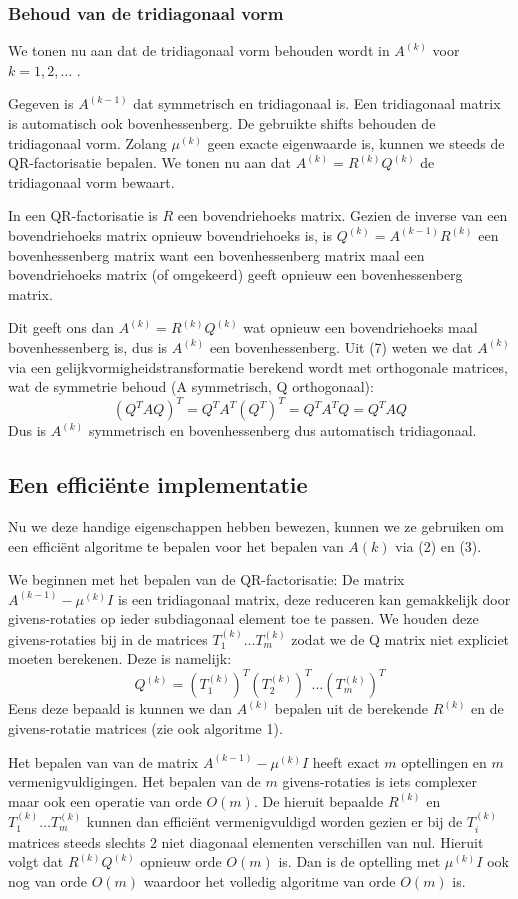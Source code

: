 \documentclass[a4paper]{article}
\begin{document}
\subsubsection{Behoud van de tridiagonaal vorm}
	We tonen nu aan dat de tridiagonaal vorm behouden wordt in $A^{(k)}$ voor $k = 1,2,\dots$ .
	
	\noindent Gegeven is $A^{(k-1)}$ dat symmetrisch en tridiagonaal is. Een tridiagonaal matrix is automatisch ook bovenhessenberg.
	De gebruikte shifts behouden de tridiagonaal vorm. Zolang $\mu ^{(k)}$ geen exacte eigenwaarde is, kunnen we steeds de QR-factorisatie bepalen. We tonen nu aan dat $A^{(k)} = R^{(k)}Q^{(k)}$ de tridiagonaal vorm bewaart.
	
	\noindent In een QR-factorisatie is $R$ een bovendriehoeks matrix. Gezien de inverse van een bovendriehoeks matrix opnieuw bovendriehoeks is, is $Q^{(k)} = A^{(k-1)}R^{(k)}$ een bovenhessenberg matrix want een bovenhessenberg matrix maal een bovendriehoeks matrix (of omgekeerd) geeft opnieuw een bovenhessenberg matrix.
	
	\noindent Dit geeft ons dan $A^{(k)} = R^{(k)}Q^{(k)}$ wat opnieuw een bovendriehoeks maal bovenhessenberg is, dus is $A^{(k)}$ een bovenhessenberg. Uit (7) weten we dat $A^{(k)}$ via een gelijkvormigheidstransformatie berekend wordt met orthogonale matrices, wat de symmetrie behoud (A symmetrisch, Q orthogonaal):
	\[
		(Q^TAQ)^T = Q^TA^T(Q^T)^T = Q^TA^TQ = Q^TAQ
	\]
	Dus is $A^{(k)}$ symmetrisch en bovenhessenberg dus automatisch tridiagonaal.
\subsection{Een efficiënte implementatie}
Nu we deze handige eigenschappen hebben bewezen, kunnen we ze gebruiken om een efficiënt algoritme te bepalen voor het bepalen van $A(k)$ via (2) en (3).

\noindent We beginnen met het bepalen van de QR-factorisatie: De matrix $A^{(k-1)} - \mu ^{(k)}I$ is een tridiagonaal matrix, deze reduceren kan gemakkelijk door givens-rotaties op ieder subdiagonaal element toe te passen. We houden deze givens-rotaties bij in de matrices $T^{(k)}_1\dots T^{(k)}_m$ zodat we de Q matrix niet expliciet moeten berekenen. Deze is namelijk:
\[
	Q^{(k)} = (T^{(k)}_1)^T(T^{(k)}_2)^T \dots (T^{(k)}_m)^T 
\]
Eens deze bepaald is kunnen we dan $A^{(k)}$ bepalen uit de berekende $R^{(k)}$ en de givens-rotatie matrices (zie ook algoritme 1). 

\noindent Het bepalen van van de matrix  $A^{(k-1)} - \mu ^{(k)}I$ heeft exact $m$ optellingen en $m$ vermenigvuldigingen.
Het bepalen van de $m$ givens-rotaties is iets complexer maar ook een operatie van orde $O(m)$. De hieruit bepaalde $R^{(k)}$ en $T^{(k)}_1\dots T^{(k)}_m$ kunnen dan efficiënt vermenigvuldigd worden gezien er bij de $T^{(k)}_i$ matrices steeds slechts 2 niet diagonaal elementen verschillen van nul. Hieruit volgt dat $R^{(k)}Q^{(k)}$ opnieuw orde $O(m)$ is. Dan is de optelling met $\mu ^{(k)}I$ ook nog van orde $O(m)$ waardoor het volledig algoritme van orde $O(m)$ is.
\end{document}
